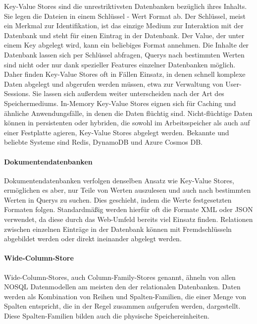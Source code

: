 Key-Value Stores sind die unrestriktivsten Datenbanken bezüglich ihres Inhalts. Sie legen die Dateien in einem Schlüssel - Wert Format ab. Der Schlüssel, meist ein Merkmal zur Identifikation, ist das einzige Medium zur Interaktion mit der Datenbank und steht für einen Eintrag in der Datenbank. Der Value, der unter einem Key abgelegt wird, kann ein beliebiges Format annehmen. Die Inhalte der Datenbank lassen sich per Schlüssel abfragen, Querys nach bestimmten Werten sind nicht oder nur dank spezieller Features einzelner Datenbanken möglich. Daher finden Key-Value Stores oft in Fällen Einsatz, in denen schnell komplexe Daten abgelegt und abgerufen werden müssen, etwa zur Verwaltung von User-Sessions. Sie lassen sich außerdem weiter unterscheiden nach der Art des Speichermediums. In-Memory Key-Value Stores eignen sich für Caching und ähnliche Anwendungsfälle, in denen die Daten flüchtig sind. Nicht-flüchtige Daten können in persistenten oder hybriden, die sowohl im Arbeitsspeicher als auch auf einer Festplatte agieren, Key-Value Stores abgelegt werden.
Bekannte und beliebte Systeme sind Redis, DynamoDB und Azure Cosmos DB.


\paragraph*{Dokumentendatenbanken}

Dokumentendatenbanken verfolgen denselben Ansatz wie Key-Value Stores, ermöglichen es aber, nur Teile von Werten auszulesen und auch nach bestimmten Werten in Querys zu suchen. Dies geschieht, indem die Werte festgesetzten Formaten folgen. Standardmäßig werden hierfür oft die Formate XML oder JSON verwendet, da diese durch das Web-Umfeld bereits viel Einsatz finden. Relationen zwischen einzelnen Einträge in der Datenbank können mit Fremdschlüsseln abgebildet werden oder direkt ineinander abgelegt werden.

\paragraph*{Wide-Column-Store}

Wide-Column-Stores, auch Column-Family-Stores genannt, ähneln von allen NOSQL Datenmodellen am meisten den der relationalen Datenbanken. Daten werden als Kombination von Reihen und Spalten-Familien, die einer Menge von Spalten entspricht, die in der Regel zusammen aufgerufen werden, dargestellt. Diese Spalten-Familien bilden auch die physische Speichereinheiten.

